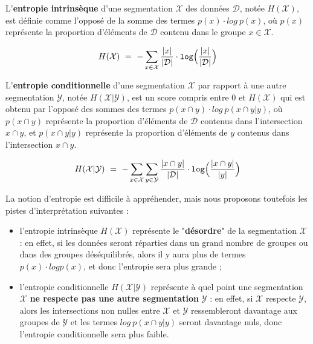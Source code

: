		L'\textbf{entropie intrinsèque} d'une segmentation $\mathcal{X}$ des données $\mathcal{D}$, notée $H(\mathcal{X})$, est définie comme l'opposé de la somme des termes $p(x) \cdot log~p(x)$,
		où $p(x)$ représente la proportion d'éléments de $\mathcal{D}$ contenu dans le groupe $x \in \mathcal{X}$.
		
		\begin{equation}
			\label{equation:D.1-ANNEXE-EVALUATION-CLUSTERING-DEFINITION-ENTROPTY}
			H(\mathcal{X})~=~
				-
				\sum\limits_{
					x \in \mathcal{X}
				}
				\frac{
					|x|
				}{
					|\mathcal{D}|
				}
				\cdot
				\texttt{log} \Bigl(
					\frac{
						|x|
					}{
						|\mathcal{D}|
					}
				\Bigr)
		\end{equation}
		
		L'\textbf{entropie conditionnelle} d'une segmentation $\mathcal{X}$ par rapport à une autre segmentation $\mathcal{Y}$, notée $H(\mathcal{X}|\mathcal{Y})$, est un score compris entre $0$ et $H(\mathcal{X})$ qui est obtenu par l'opposé des sommes des termes $p(x \cap y) \cdot log~p(x \cap y|y)$,
		où $p(x \cap y)$ représente la proportion d'éléments de $\mathcal{D}$ contenus dans l'intersection $x \cap y$,
		et $p(x \cap y|y)$ représente la proportion d'éléments de $y$ contenus dans l'intersection $x \cap y$.
		
		\begin{equation}
			\label{equation:D.1-ANNEXE-EVALUATION-CLUSTERING-DEFINITION-ENTROPTY-CONDITIONNELLE}
			H(\mathcal{X}|\mathcal{Y})~=~
				-
				\sum\limits_{
					x \in \mathcal{X}
				}
				\sum\limits_{
					y \in \mathcal{Y}
				}
				\frac{
					|x \cap y|
				}{
					|\mathcal{D}|
				}
				\cdot
				\texttt{log} \Bigl(
					\frac{
						|x \cap y|
					}{
						|y|
					}
				\Bigr)
		\end{equation}
		
		\begin{leftBarAuthorOpinion}
			La notion d'entropie est difficile à appréhender, mais nous proposons toutefois les pistes d'interprétation suivantes :
			\begin{itemize}
				\item l'entropie intrinsèque $H(\mathcal{X})$ représente le "\textbf{désordre}" de la segmentation $\mathcal{X}$ :
				en effet, si les données seront réparties dans un grand nombre de groupes ou dans des groupes déséquilibrés, alors il y aura plus de termes $p(x) \cdot log p(x)$, et donc l'entropie sera plus grande ;
				\item l'entropie conditionnelle $H(\mathcal{X}|\mathcal{Y})$ représente à quel point une segmentation $\mathcal{X}$ \textbf{ne respecte pas une autre segmentation} $\mathcal{Y}$ :
				en effet, si $\mathcal{X}$ respecte $\mathcal{Y}$, alors les intersections non nulles entre $\mathcal{X}$ et $\mathcal{Y}$ ressembleront davantage aux groupes de $\mathcal{Y}$ et les termes $log~p(x \cap y|y)$ seront davantage nuls, donc l'entropie conditionnelle sera plus faible.
			\end{itemize}
		\end{leftBarAuthorOpinion}
		
